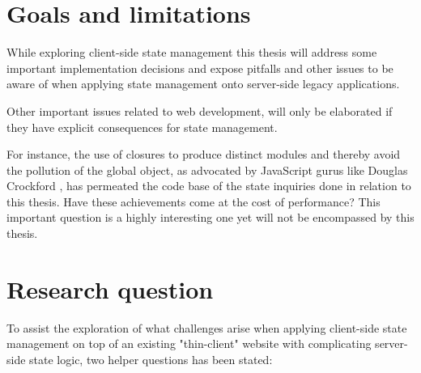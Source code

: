 \documentclass[english]{ifimaster}
\begin{document}



\section{Goals and limitations}
While exploring client-side state management this thesis will address some important implementation decisions and expose pitfalls and other issues to be aware of when applying state management onto server-side legacy applications.

Other important issues related to web development, will only be elaborated if they have explicit consequences for state management. 

For instance, the use of closures to produce distinct modules and thereby avoid the pollution of the global object, as advocated by JavaScript gurus like Douglas Crockford  \parencite{crockford}, has permeated the code base of the state inquiries done in relation to this thesis. Have these achievements come at the cost of performance? This important question is a highly interesting one yet will not be encompassed by this thesis.

\section{Research question}
To assist the exploration of what challenges arise when applying client-side state management on top of an existing "thin-client" website with complicating server-side state logic, two helper questions has been stated:
\end{document}
